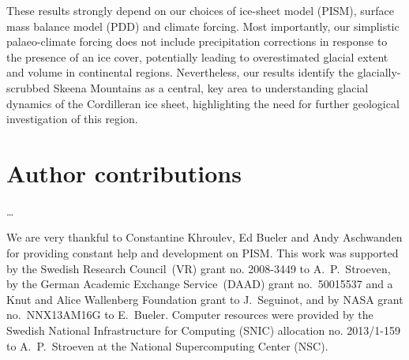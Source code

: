 \documentclass[tc, manuscript]{copernicus}
\begin{document}
These results strongly depend on our choices of ice-sheet model (PISM), surface
mass balance model (PDD) and climate forcing. Most importantly, our simplistic
palaeo-climate forcing does not include precipitation corrections in response
to the presence of an ice cover, potentially leading to overestimated glacial
extent and volume in continental regions. Nevertheless, our results identify
the glacially-scrubbed Skeena Mountains as a central, key area to understanding
glacial dynamics of the Cordilleran ice sheet, highlighting the need for
further geological investigation of this region.

\section*{Author contributions}
\dots

\begin{acknowledgements}
We are very thankful to Constantine Khroulev, Ed Bueler and Andy Aschwanden for
providing constant help and development on PISM. This work was supported by the
Swedish Research Council~(VR) grant no. 2008-3449 to A.~P.~Stroeven, by the
German Academic Exchange Service~(DAAD) grant no.~50015537 and a Knut and Alice
Wallenberg Foundation grant to J.~Seguinot, and by NASA grant no.~NNX13AM16G
to E.~Bueler. Computer resources were provided by the Swedish National
Infrastructure for Computing (SNIC) allocation no. 2013/1-159 to A.~P.~Stroeven
at the National Supercomputing Center (NSC).
\end{acknowledgements}



\newpage

\end{document}
